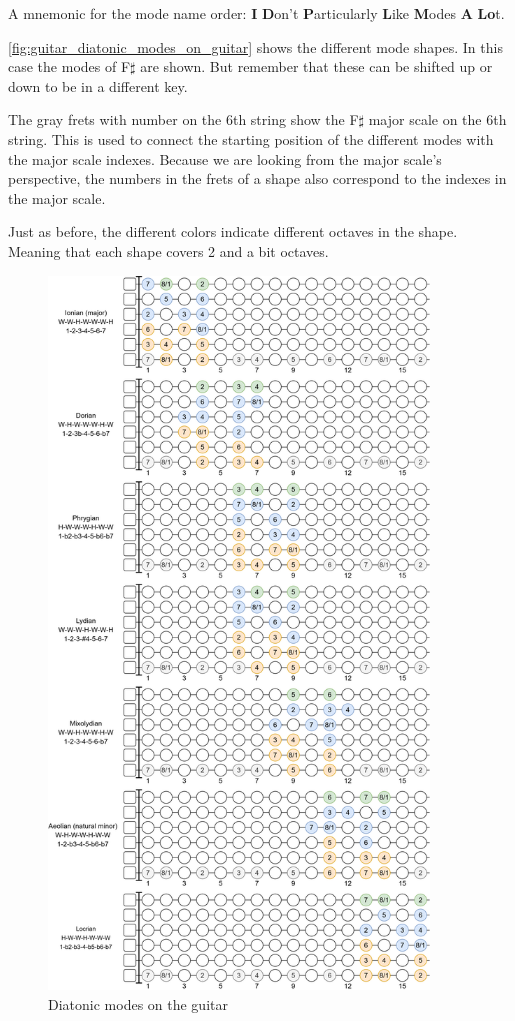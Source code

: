 A mnemonic for the mode name order: \textbf{I} \textbf{D}on't \textbf{P}articularly \textbf{L}ike \textbf{M}odes \textbf{A} \textbf{Lo}t.

\autoref{fig:guitar_diatonic_modes_on_guitar} shows the different mode shapes. In this case the modes of F$\sharp$ are shown. But remember that these can be shifted up or down to be in a different key.

The gray frets with number on the 6th string show the F$\sharp$ major scale on the 6th string. This is used to connect the starting position of the different modes with the major scale indexes. Because we are looking from the major scale's perspective, the numbers in the frets of a shape also correspond to the indexes in the major scale.

Just as before, the different colors indicate different octaves in the shape. Meaning that each shape covers 2 and a bit octaves.

\newpage

\begin{figure}[h]
	\centering
	\includegraphics[width=0.9\textwidth]{../../Images/guitar_mode_all.png}
	\caption{Diatonic modes on the guitar}
	\label{fig:guitar_diatonic_modes_on_guitar}
\end{figure}

